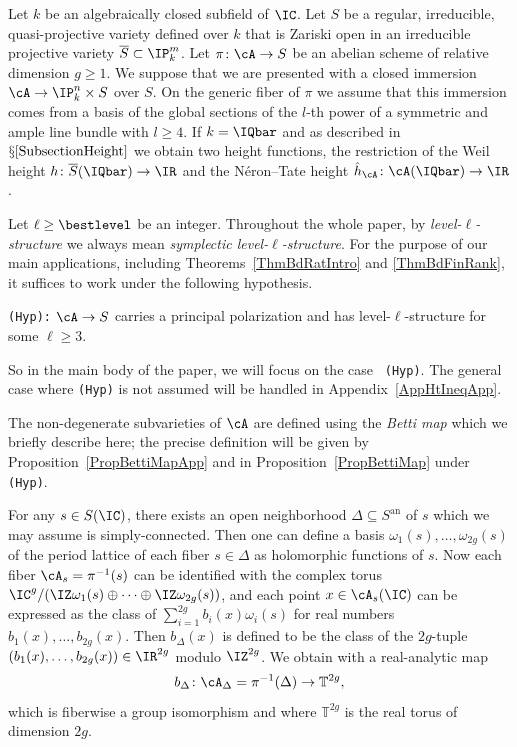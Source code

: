 Let $k$ be an algebraically closed subfield of $\IC$. Let $S$ be a
regular, irreducible, quasi-projective variety defined over $k$ that
is Zariski open in an irreducible projective variety
$\overline S \subset\IP_k^m$. Let $\pi \colon \cA \rightarrow S$ be an
abelian scheme of relative dimension $g\ge 1$. We suppose that we are
presented with a closed immersion $\cA\rightarrow\IP_k^n\times S$ over
$S$. On the generic fiber of $\pi$ we assume that this immersion comes
from a basis of the global sections of the $l$-th power of a symmetric
and ample line bundle with $l\ge 4$. If $k=\IQbar$ and as described in
$\mathsection\ref{SubsectionHeight}$ we obtain two height functions,
the restriction of the Weil height
$h\colon \overline{S}(\IQbar)\rightarrow \IR$ and the N\'eron--Tate
height $\hat h_{\cA} \colon \cA(\IQbar)\rightarrow \IR$.

Let  $\ell\ge \bestlevel$ be an integer. Throughout the whole paper, by \textit{level-$\ell$-structure} we always mean \textit{symplectic level-$\ell$-structure}. For the purpose of our main applications, including
Theorems~\ref{ThmBdRatIntro} and \ref{ThmBdFinRank}, it suffices to
work under the following hypothesis.

  \label{def:hyp}
  {\tt (Hyp):} $\cA\rightarrow S$ carries a principal polarization and has level-$\ell$-structure for some $\ell \ge 3$.

So in the main body of the paper, we will focus on the case {\tt
(Hyp)}. The general case where {\tt (Hyp)} is not assumed will be
handled in Appendix~\ref{AppHtIneqApp}.


The non-degenerate subvarieties of $\cA$ are defined using the
\textit{Betti map} which we briefly describe here;
the precise definition will be given by
Proposition~\ref{PropBettiMapApp} and in Proposition~\ref{PropBettiMap} under {\tt (Hyp)}.

For any $s \in S(\IC)$, there exists an open neighborhood $\Delta
\subseteq S^{\mathrm{an}}$ of $s$ which we may assume is simply-connected. Then one can define a basis $\omega_1(s),\ldots,\omega_{2g}(s)$ of the period lattice of each fiber $s \in \Delta$ as holomorphic functions of $s$. Now each fiber $\cA_s = \pi^{-1}(s)$ can be identified with the complex torus $\IC^g/(\IZ \omega_1(s)\oplus \cdots \oplus \IZ\omega_{2g}(s))$, and each point $x \in \cA_s(\IC)$ can be expressed as the class of $\sum_{i=1}^{2g}b_i(x) \omega_i(s)$ for real numbers $b_1(x),\ldots,b_{2g}(x)$. Then $b_{\Delta}(x)$ is defined to be the class of the $2g$-tuple $(b_1(x),\ldots,b_{2g}(x)) \in \IR^{2g}$ modulo $\IZ^{2g}$.
We obtain with a real-analytic map
\[
b_{\Delta} \colon \cA_{\Delta} = \pi^{-1}(\Delta) \rightarrow \mathbb{T}^{2g},
\]
which is fiberwise a group isomorphism and
where $\mathbb{T}^{2g}$ is the real torus of dimension $2g$.


